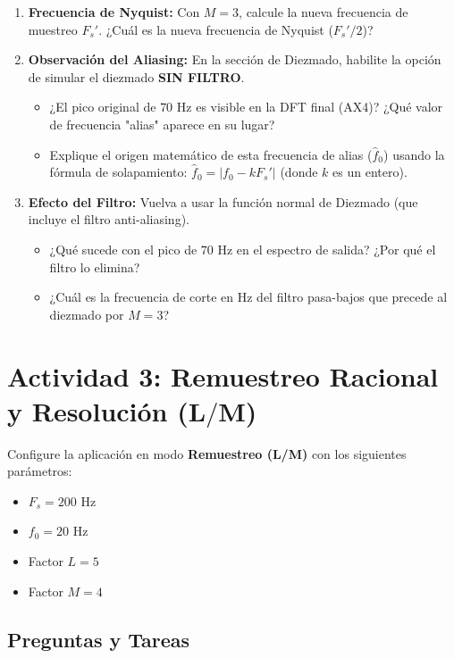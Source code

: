 \documentclass[11pt, a4paper]{article}
\begin{document}
\begin{enumerate}
    \item \textbf{Frecuencia de Nyquist:} Con $M=3$, calcule la nueva frecuencia de muestreo $F_s'$. ¿Cuál es la nueva frecuencia de Nyquist ($F_s'/2$)?
    \item \textbf{Observación del Aliasing:} En la sección de Diezmado, habilite la opción de simular el diezmado \textbf{SIN FILTRO}.
    \begin{itemize}
        \item ¿El pico original de $70 \text{ Hz}$ es visible en la DFT final (AX4)? ¿Qué valor de frecuencia "alias" aparece en su lugar?
        \item Explique el origen matemático de esta frecuencia de alias ($\hat{f}_0$) usando la fórmula de solapamiento: $\hat{f}_0 = |f_0 - k F_s'|$ (donde $k$ es un entero).
    \end{itemize}
    \item \textbf{Efecto del Filtro:} Vuelva a usar la función normal de Diezmado (que incluye el filtro anti-aliasing).
    \begin{itemize}
        \item ¿Qué sucede con el pico de $70 \text{ Hz}$ en el espectro de salida? ¿Por qué el filtro lo elimina?
        \item ¿Cuál es la frecuencia de corte en $\text{Hz}$ del filtro pasa-bajos que precede al diezmado por $M=3$?
    \end{itemize}
\end{enumerate}

\section{Actividad 3: Remuestreo Racional y Resolución ($\mathbf{L/M}$)}

Configure la aplicación en modo \textbf{Remuestreo (L/M)} con los siguientes parámetros:
\begin{itemize}
    \item $F_s = 200 \text{ Hz}$
    \item $f_0 = 20 \text{ Hz}$
    \item Factor $L = 5$
    \item Factor $M = 4$
\end{itemize}

\subsection{Preguntas y Tareas}
\end{document}
